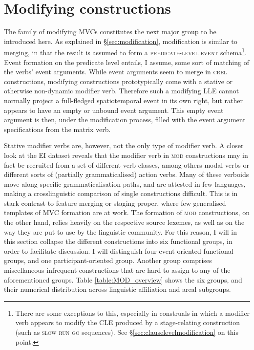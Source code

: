 \section{Modifying constructions}\label{sec:modifying}

The family of modifying MVCs constitutes the next major group to be introduced here. As explained in §\ref{sec:modification}, modification is similar to merging, in that the result is assumed to form a \textsc{predicate-level event} schema\footnote{There are some exceptions to this, especially in construals in which a modifier verb appears to modify the CLE produced by a stage-relating construction (such as \textsc{slow} \textsc{run} \textsc{go} sequences). See §\ref{sec:clauselevelmodification} on this point.}. Event formation on the predicate level entails, I assume, some sort of matching of the verbs' event arguments. While event arguments seem to merge in \textsc{crel} constructions, modifying constructions prototypically come with a stative or otherwise non-dynamic modifier verb. Therefore such a modifying LLE cannot normally project a full-fledged spatiotemporal event in its own right, but rather appears to have an empty or unbound event argument. This empty event argument is then, under the modification process, filled with the event argument specifications from the matrix verb.

Stative modifier verbs are, however, not the only type of modifier verb. A closer look at the EI dataset reveals that the modifier verb in \textsc{mod} constructions may in fact be recruited from a set of different verb classes, among others modal verbs or different sorts of (partially grammaticalised) action verbs. Many of these verboids move along specific grammaticalisation paths, and are attested in few languages, making a crosslinguistic comparison of single constructions difficult. This is in stark contrast to feature merging or staging proper, where few generalised templates of MVC formation are at work. The formation of \textsc{mod} constructions, on the other hand, relies heavily on the respective source lexemes, as well as on the way they are put to use by the linguistic community. For this reason, I will in this section collapse the different constructions into six functional groups, in order to facilitate discussion. I will distinguish four event-oriented functional groups, and one participant-oriented group. Another group comprises miscellaneous infrequent constructions that are hard to assign to any of the aforementioned groups. Table \ref{table:MOD_overview} shows the six groups, and their numerical distribution across linguistic affiliation and areal subgroups.

